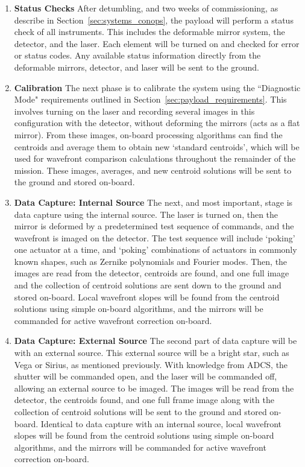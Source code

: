 \documentclass[12pt]{article}
\begin{document}
\begin{enumerate}
\item{\textbf{Status Checks}}
After detumbling, and two weeks of commissioning, as describe in
Section~\ref{sec:systems_conops}, the payload will perform a status check of all instruments. This includes the deformable mirror system, the detector, and the laser. Each element will be turned on and checked for error or status codes. Any available status information directly from the deformable mirrors, detector, and laser will be sent to the ground.

\item{\textbf{Calibration}}
The next phase is to calibrate the system using the ``Diagnostic Mode" requirements outlined in Section~\ref{sec:payload_requirements}.  This involves turning on the laser and recording several images in this configuration with the detector, without deforming the mirrors (acts as a flat mirror). From these images, on-board processing algorithms can find the centroids \cite{centroids} and average them to obtain new `standard centroids', which will be used for wavefront comparison calculations throughout the remainder of the mission. These images, averages, and new centroid solutions will be sent to the ground and stored on-board.

\item{\textbf{Data Capture: Internal Source}}
The next, and most important, stage is data capture using the internal source. The laser is turned on, then the mirror is deformed by a predetermined test sequence of commands, and the wavefront is imaged on the detector. The test sequence will include `poking' one actuator at a time, and `poking' combinations of actuators in commonly known shapes, such as Zernike polynomials and Fourier modes.  Then, the images are read from the detector, centroids are found, and one full image and the collection of centroid solutions are sent down to the ground and stored on-board.  Local wavefront slopes will be found from the centroid solutions using simple on-board algorithms, and the mirrors will be commanded for active wavefront correction on-board.

\item{\textbf{Data Capture: External Source}}
The second part of data capture will be with an external source. This external source will be a bright star, such as Vega or Sirius, as mentioned previously.  With
knowledge from ADCS, the shutter will be commanded open, and the laser
will be commanded off, allowing an external source to be imaged. The
images will be read from the detector, the centroids found, and one
full frame image along with the collection of centroid solutions will be
sent to the ground and stored on-board.  Identical to data capture with an internal source, local wavefront slopes will be found from the centroid solutions using simple on-board algorithms, and the mirrors will be commanded for active wavefront correction on-board. 

\end{enumerate}
\end{document}
